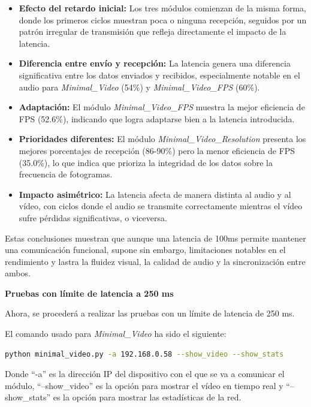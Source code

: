 \begin{itemize}
    \item \textbf{Efecto del retardo inicial:} Los tres módulos comienzan de la misma forma, donde los primeros ciclos muestran poca o ninguna recepción, seguidos por un patrón irregular de transmisión que refleja directamente el impacto de la latencia.
    
    \item \textbf{Diferencia entre envío y recepción:} La latencia genera una diferencia significativa entre los datos enviados y recibidos, especialmente notable en el audio para \textit{Minimal\_Video} (54\%) y \textit{Minimal\_Video\_FPS} (60\%).
    
    \item \textbf{Adaptación:} El módulo \textit{Minimal\_Video\_FPS} muestra la mejor eficiencia de FPS (52.6\%), indicando que logra adaptarse bien a la latencia introducida.
    
    \item \textbf{Prioridades diferentes:} El módulo \textit{Minimal\_Video\_Resolution} presenta los mejores porcentajes de recepción (86-90\%) pero la menor eficiencia de FPS (35.0\%), lo que indica que prioriza la integridad de los datos sobre la frecuencia de fotogramas.
    
    \item \textbf{Impacto asimétrico:} La latencia afecta de manera distinta al audio y al vídeo, con ciclos donde el audio se transmite correctamente mientras el vídeo sufre pérdidas significativas, o viceversa.
\end{itemize}

Estas conclusiones muestran que aunque una latencia de 100ms permite mantener una comunicación funcional, supone sin embargo, limitaciones notables en el rendimiento y lastra la fluidez visual, la calidad de audio y la sincronización entre ambos.


\newpage

\textbf{Pruebas con límite de latencia a 250 ms}
\vspace{\baselineskip}

Ahora, se procederá a realizar las pruebas con un límite de latencia de 250 ms.
\vspace{\baselineskip}

El comando usado para \textit{Minimal\_Video} ha sido el siguiente:

\begin{lstlisting}[language=bash]
python minimal_video.py -a 192.168.0.58 --show_video --show_stats
\end{lstlisting}
Donde ``-a'' es la dirección IP del dispositivo con el que se va a comunicar el módulo, ``--show\_video'' es la opción para mostrar el vídeo en tiempo real y ``--show\_stats'' es la opción para mostrar las estadísticas de la red.
\vspace{\baselineskip}

